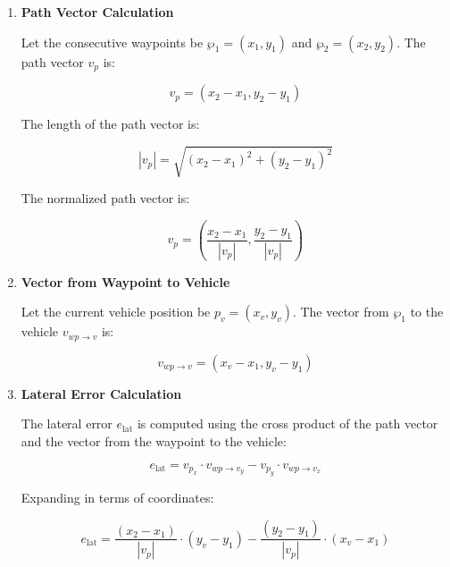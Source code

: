 \documentclass[conference]{IEEEtran}
\begin{document}
\begin{enumerate}
    \item \textbf{Path Vector Calculation}

    Let the consecutive waypoints be $\wp_1 = (x_1, y_1)$ and $\wp_2 = (x_2, y_2)$. The path vector $v_p$ is:
    
    \begin{equation}
    v_p = (x_2 - x_1, y_2 - y_1)
    \end{equation}
    
    The length of the path vector is:
    
    \begin{equation}
    |v_p| = \sqrt{(x_2 - x_1)^2 + (y_2 - y_1)^2}
    \end{equation}
    
    The normalized path vector is:
    
    \begin{equation}
    v_p = \left( \frac{x_2 - x_1}{|v_p|}, \frac{y_2 - y_1}{|v_p|} \right)
    \end{equation}
    
    \item \textbf{Vector from Waypoint to Vehicle}
    
    Let the current vehicle position be $p_v = (x_v, y_v)$. The vector from $\wp_1$ to the vehicle $v_{wp \to v}$ is:
    
    \begin{equation}
    v_{wp \to v} = (x_v - x_1, y_v - y_1)
    \end{equation}
    
    \item \textbf{Lateral Error Calculation}
    
    The lateral error $e_{\text{lat}}$ is computed using the cross product of the path vector and the vector from the waypoint to the vehicle:
    
    \begin{equation}
    e_{\text{lat}} = v_{p_x} \cdot v_{wp \to v_y} - v_{p_y} \cdot v_{wp \to v_x}
    \end{equation}
    
    Expanding in terms of coordinates:
    
    \begin{equation}
    e_{\text{lat}} = \frac{(x_2 - x_1)}{|v_p|} \cdot (y_v - y_1) - \frac{(y_2 - y_1)}{|v_p|} \cdot (x_v - x_1)
    \end{equation}

\end{enumerate}
\end{document}
